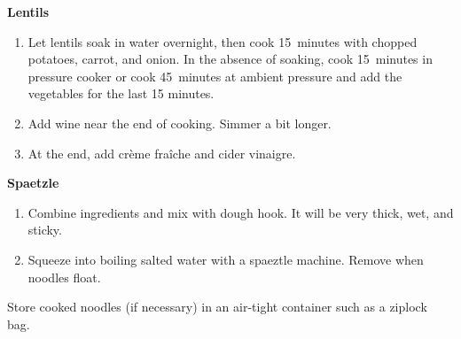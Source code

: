 
\textbf{Lentils}

\begin{ingredients}
\end{ingredients}


\begin{recipe}
  \begin{enumerate}

  \item Let lentils soak in water overnight, then cook 15~minutes with
    chopped potatoes, carrot, and onion.  In the absence of soaking,
    cook 15~minutes in pressure cooker or cook 45~minutes at ambient
    pressure and add the vegetables for the last 15 minutes.

  \item Add wine near the end of cooking.  Simmer a bit longer.

  \item At the end, add crème fraîche and cider vinaigre.

  \end{enumerate}
\end{recipe}

\textbf{Spaetzle}

\begin{ingredients}
\end{ingredients}


\begin{recipe}
  \begin{enumerate}

  \item Combine ingredients and mix with dough hook.  It will be very
    thick, wet, and sticky.

  \item Squeeze into boiling salted water with a spaeztle machine.
    Remove when noodles float.

  \end{enumerate}
\end{recipe}

Store cooked noodles (if necessary) in an air-tight container such as
a ziplock bag.


